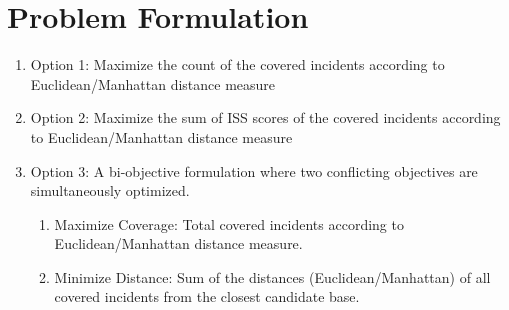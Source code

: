 \section{Problem Formulation}
\label{sec:problem} \label{sec:math-formulation}

\begin{enumerate}
	
	\item Option 1: Maximize the count of the covered incidents according to Euclidean/Manhattan distance measure
	
	\item Option 2: Maximize the sum of ISS scores of the covered incidents according to Euclidean/Manhattan distance measure
	
	\item  Option 3: A bi-objective formulation where two conflicting objectives are simultaneously optimized.
	
	\begin{enumerate}
		
		\item Maximize Coverage: Total covered incidents according to Euclidean/Manhattan distance measure.
		
		\item Minimize Distance: Sum of the distances (Euclidean/Manhattan) of all covered incidents from the closest candidate base.
		
		
	\end{enumerate}
	
	
\end{enumerate}



